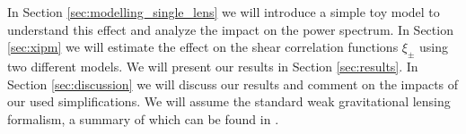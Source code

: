 In Section \ref{sec:modelling_single_lens} we will introduce a simple toy model to understand this effect and analyze the impact on the power spectrum. In Section \ref{sec:xipm} we will estimate the effect on the shear correlation functions $\xi_\pm$ using two different models. We will present our results in Section \ref{sec:results}. In Section \ref{sec:discussion} we will discuss our results and comment on the impacts of our used simplifications. We will assume the standard weak gravitational lensing formalism, a summary of which can be found in \citet{2001PhR...340..291B}.
